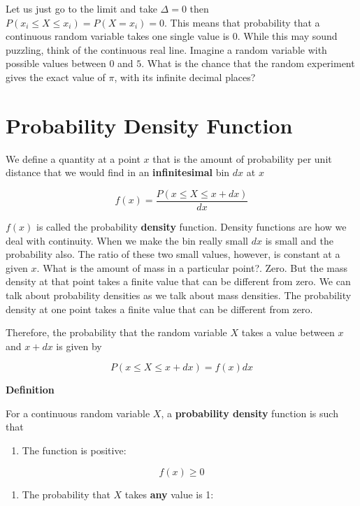 \documentclass[
]{book}
\providecommand{\tightlist}{%
  \setlength{\itemsep}{0pt}\setlength{\parskip}{0pt}}
\begin{document}
Let us just go to the limit and take \(\Delta =0\) then \(P(x_i \leq X \leq x_i)=P(X=x_i)=0\). This means that probability that a continuous random variable takes one single value is \(0\). While this may sound puzzling, think of the continuous real line. Imagine a random variable with possible values between \(0\) and \(5\). What is the chance that the random experiment gives the exact value of \(\pi\), with its infinite decimal places?

\hypertarget{probability-density-function}{%
\section{Probability Density Function}\label{probability-density-function}}

We define a quantity at a point \(x\) that is the amount of probability per unit distance that we would find in an \textbf{infinitesimal} bin \(dx\) at \(x\)

\[f(x)= \frac{P(x\leq X \leq x+dx)}{dx}\]

\(f(x)\) is called the probability \textbf{density} function. Density functions are how we deal with continuity. When we make the bin really small \(dx\) is small and the probability also. The ratio of these two small values, however, is constant at a given \(x\). What is the amount of mass in a particular point?. Zero. But the mass density at that point takes a finite value that can be different from zero. We can talk about probability densities as we talk about mass densities. The probability density at one point takes a finite value that can be different from zero.

Therefore, the probability that the random variable \(X\) takes a value between \(x\) and \(x+dx\)
is given by

\[P(x\leq X \leq x+dx)= f(x) dx\]

\textbf{Definition}

For a continuous random variable \(X\), a \textbf{probability density} function is such that

\begin{enumerate}
\def\labelenumi{\arabic{enumi})}
\tightlist
\item
  The function is positive:
\end{enumerate}

\[f(x) \geq 0\]

\begin{enumerate}
\def\labelenumi{\arabic{enumi})}
\setcounter{enumi}{1}
\tightlist
\item
  The probability that \(X\) takes \textbf{any} value is 1:
\end{enumerate}
\end{document}

